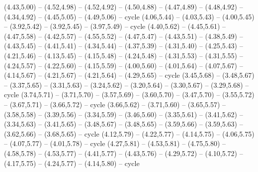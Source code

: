 {  (4.43,5.00) -- (4.52,4.98) -- (4.52,4.92) -- (4.50,4.88) -- (4.47,4.89) -- (4.48,4.92) -- (4.34,4.92) -- (4.45,5.05) -- (4.49,5.06) -- cycle
  (4.06,5.44) -- (4.03,5.43) -- (4.00,5.45) -- (3.92,5.42) -- (3.92,5.45) -- (3.97,5.49) -- cycle
  (4.40,5.62) -- (4.45,5.61) -- (4.47,5.58) -- (4.42,5.57) -- (4.55,5.52) -- (4.47,5.47) -- (4.43,5.51) -- (4.38,5.49) -- (4.43,5.45) -- (4.41,5.41) -- (4.34,5.44) -- (4.37,5.39) -- (4.31,5.40) -- (4.25,5.43) -- (4.21,5.46) -- (4.13,5.45) -- (4.15,5.48) -- (4.24,5.48) -- (4.31,5.53) -- (4.31,5.55) -- (4.24,5.57) -- (4.22,5.60) -- (4.15,5.59) -- (4.00,5.60) -- (4.01,5.64) -- (4.07,5.67) -- (4.14,5.67) -- (4.21,5.67) -- (4.21,5.64) -- (4.29,5.65) -- cycle
  (3.45,5.68) -- (3.48,5.67) -- (3.37,5.65) -- (3.31,5.63) -- (3.24,5.62) -- (3.20,5.64) -- (3.30,5.67) -- (3.29,5.68) -- cycle
  (3.74,5.71) -- (3.71,5.70) -- (3.57,5.69) -- (3.60,5.70) -- (3.47,5.70) -- (3.55,5.72) -- (3.67,5.71) -- (3.66,5.72) -- cycle
  (3.66,5.62) -- (3.71,5.60) -- (3.65,5.57) -- (3.58,5.58) -- (3.39,5.56) -- (3.34,5.59) -- (3.46,5.60) -- (3.35,5.61) -- (3.41,5.62) -- (3.34,5.63) -- (3.41,5.65) -- (3.48,5.67) -- (3.48,5.65) -- (3.59,5.66) -- (3.59,5.63) -- (3.62,5.66) -- (3.68,5.65) -- cycle
  (4.12,5.79) -- (4.22,5.77) -- (4.14,5.75) -- (4.06,5.75) -- (4.07,5.77) -- (4.01,5.78) -- cycle
  (4.27,5.81) -- (4.53,5.81) -- (4.75,5.80) -- (4.58,5.78) -- (4.53,5.77) -- (4.41,5.77) -- (4.43,5.76) -- (4.29,5.72) -- (4.10,5.72) -- (4.17,5.75) -- (4.24,5.77) -- (4.14,5.80) -- cycle}
